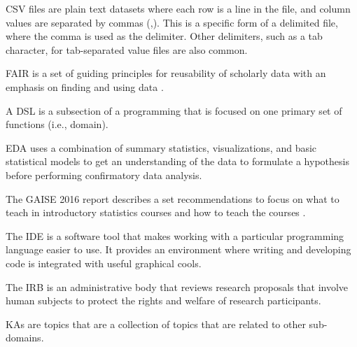 \documentclass[../main.tex]{subfiles}
\begin{document}


  CSV files are plain text datasets where each row is a line in the file,
  and column values are separated by commas (,).
  This is a specific form of a delimited file, where the comma is used as the delimiter.
  Other delimiters, such as a tab character, for tab-separated value files are also common.



  FAIR is a set of guiding principles for reusability of scholarly data with an emphasis on finding and using data
  \cite{wilkinsonFAIRGuidingPrinciples2016}.



  A DSL is a subsection of a programming that is focused on one primary set of functions (i.e., domain).

  
  
  EDA uses a combination of summary statistics, visualizations, and basic statistical models to get an understanding of the data
  to formulate a hypothesis before performing confirmatory data analysis.



  The GAISE 2016 report describes a set recommendations to focus on
  what to teach in introductory statistics courses and
  how to teach the courses
  \cite{gaise2016}.



  The IDE is a software tool that makes working with a particular programming language easier to use.
  It provides an environment where writing and developing code is integrated with useful
  graphical cools.



  The IRB is an administrative body that reviews research proposals that involve human subjects to protect the rights and welfare of
  research participants.



  KAs are topics that are a collection of topics that are related to other sub-domains.

\end{document}
